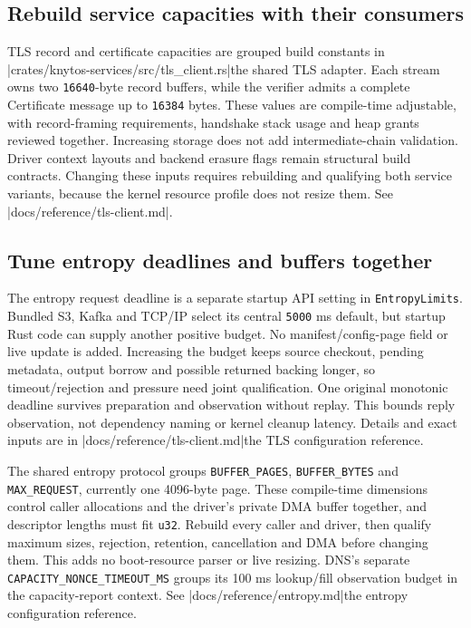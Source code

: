 \subsection{Rebuild service capacities with their consumers}

TLS record and certificate capacities are grouped build constants in
\repofiletext|crates/knytos-services/src/tls_client.rs|{the shared TLS adapter}.
Each stream owns two
\texttt{16640}-byte record buffers, while the verifier admits a complete Certificate
message up to \texttt{16384} bytes. These values are compile-time adjustable,
with record-framing requirements, handshake stack usage and heap grants reviewed
together. Increasing storage does not add intermediate-chain validation.
Driver context layouts and backend erasure flags remain structural build
contracts. Changing these inputs requires rebuilding and qualifying both service
variants, because the kernel resource profile does not resize them. See
\repofile|docs/reference/tls-client.md|.

\subsection{Tune entropy deadlines and buffers together}

The entropy request deadline is a separate startup API setting in
\texttt{EntropyLimits}. Bundled S3, Kafka and TCP/IP select its central
\texttt{5000} ms default, but startup Rust code can supply another positive budget.
No manifest/config-page field or live update is added. Increasing the budget
keeps source checkout, pending metadata, output borrow and possible returned
backing longer, so timeout/rejection and pressure need joint qualification.
One original monotonic deadline survives preparation and observation without
replay. This bounds reply observation, not dependency naming or kernel cleanup
latency. Details and exact inputs are in
\repofiletext|docs/reference/tls-client.md|{the TLS configuration reference}.

The shared entropy protocol groups \texttt{BUFFER\_PAGES},
\texttt{BUFFER\_BYTES} and \texttt{MAX\_REQUEST}, currently one 4096-byte page.
These compile-time dimensions control caller allocations and
the driver's private DMA buffer together, and descriptor lengths must fit
\texttt{u32}. Rebuild every caller and driver, then qualify maximum sizes,
rejection, retention, cancellation and DMA before changing them. This adds no
boot-resource parser or live resizing. DNS's separate
\texttt{CAPACITY\_NONCE\_TIMEOUT\_MS} groups its 100 ms lookup/fill observation
budget in the capacity-report context. See
\repofiletext|docs/reference/entropy.md|{the entropy configuration reference}.

